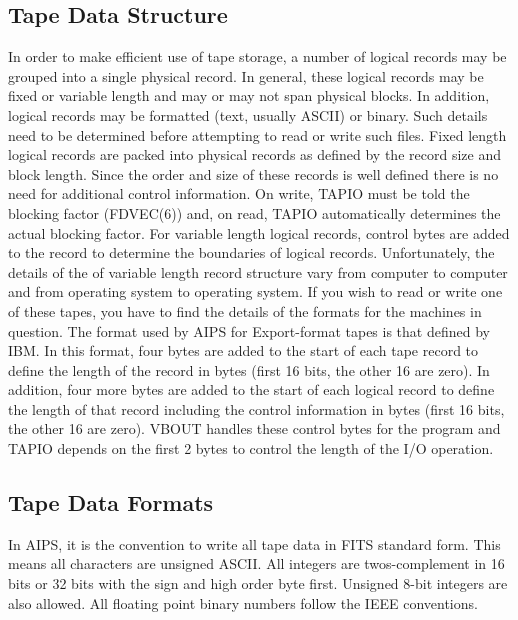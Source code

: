 \subsection{Tape Data Structure}
In order to make efficient use of tape storage, a number of logical
records may be grouped into a single physical record.  In general,
these logical records may be fixed or variable length and may or may
not span physical blocks.  In addition, logical records may be
formatted (text, usually ASCII) or binary.  Such details need to be
determined before attempting to read or write such files. Fixed length
logical records are packed into physical records as defined by the
record size and block length.  Since the order and size of these
records is well defined there is no need for additional control
information.  On write, TAPIO must be told the blocking factor
(FDVEC(6)) and, on read, TAPIO automatically determines the actual
blocking factor. For variable length logical records, control bytes
are added to the record to determine the boundaries of logical
records. Unfortunately, the details of the of variable length record
structure vary from computer to computer and from operating system to
operating system. If you wish to read or write one of these tapes, you
have to find the details of the formats for the machines in question.
The format used by AIPS for Export-format tapes is that defined by
IBM.  In this format, four bytes are added to the start of each tape
record to define the length of the record in bytes (first 16 bits, the
other 16 are zero).  In addition, four more bytes are added to the
start of each logical record to define the length of that record
including the control information in bytes (first 16 bits, the other
16 are zero). VBOUT handles these control bytes for the program and
TAPIO depends on the first 2 bytes to control the length of the I/O
operation.

\subsection{Tape Data Formats}
In AIPS, it is the convention to write all tape data in FITS standard
form.  This means all characters are unsigned ASCII.  All integers are
twos-complement in 16 bits or 32 bits with the sign and high order
byte first.  Unsigned 8-bit integers are also allowed. All floating
point binary numbers follow the IEEE conventions.

